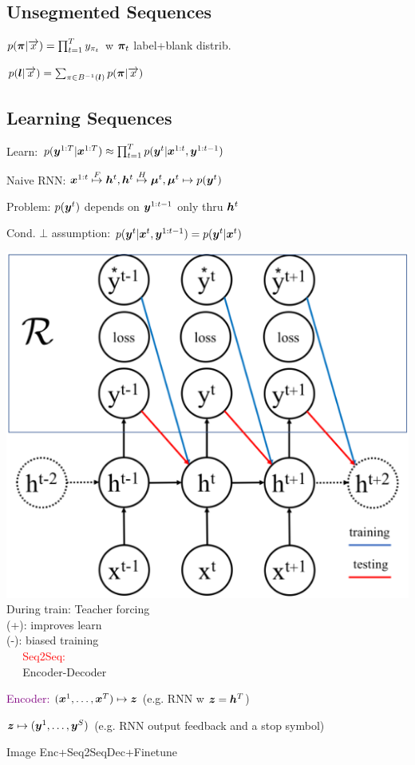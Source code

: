 \subsection*{Unsegmented Sequences}
$p(\boldsymbol{\pi}|\overrightarrow{x})=\prod^T_{t=1}y_{\pi_t}$ w $\boldsymbol{\pi}_t$ label+blank distrib.

$p(\boldsymbol{l}|\overrightarrow{x})=\sum_{\pi\in B^{-1}(\boldsymbol{l})}p(\boldsymbol{\pi}|\overrightarrow{x})$

\subsection*{Learning Sequences}
Learn: $p(\boldsymbol{y}^{1:T}|\boldsymbol{x}^{1:T})\approx\prod^T_{t=1} p(\boldsymbol{y}^t|\boldsymbol{x}^{1:t},\boldsymbol{y}^{1:t-1})$

Naive RNN: $\boldsymbol{x}^{1:t}\stackrel{F}{\mapsto}\boldsymbol{h}^t, \boldsymbol{h}^t\stackrel{H}{\mapsto}\boldsymbol{\mu}^t, \boldsymbol{\mu}^t\mapsto p(\boldsymbol{y}^t)$

Problem: $p(\boldsymbol{y}^t)$ depends on $\boldsymbol{y}^{1:t-1}$ only thru $\boldsymbol{h}^t$

Cond. $\bot$ assumption: $p(\boldsymbol{y}^t|\boldsymbol{x}^t,\boldsymbol{y}^{1:t-1})=p(\boldsymbol{y}^t|\boldsymbol{x}^t)$


\begin{multicols}{2}
\includegraphics[width=\textwidth/7
]{ETH-DS-2020/AML/Resources/seq_feedback.png}
\\
During train: Teacher forcing\\
(+): improves learn\\
(-): biased training\\
$\; \; \; \;$
\textcolor{red}{Seq2Seq:}\\
$\; \; \; \;$ Encoder-Decoder
\end{multicols}
\textcolor{purple}{Encoder:} $(\boldsymbol{x}^1,\dots,\boldsymbol{x}^T)\mapsto\boldsymbol{z}$ (e.g. RNN w $\boldsymbol{z}=\boldsymbol{h}^T$)

\color{purple}{Decoder:} $\boldsymbol{z}\mapsto(\boldsymbol{y}^1,\dots,\boldsymbol{y}^S)$ \color{myblue}
(e.g. RNN  output feedback and a stop symbol)

Image Enc+Seq2SeqDec+Finetune